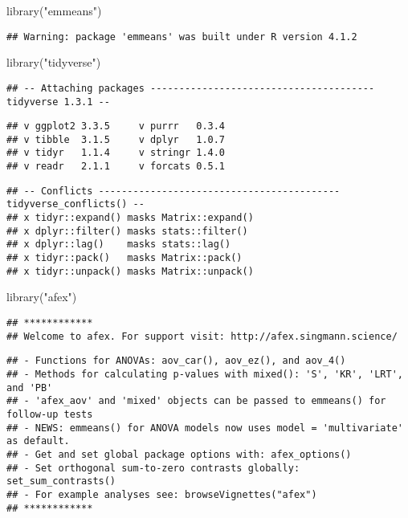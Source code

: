 \documentclass[
]{article}
\newenvironment{Shaded}{\begin{snugshade}}{\end{snugshade}}
\newcommand{\FunctionTok}[1]{\textcolor[rgb]{0.00,0.00,0.00}{#1}}
\newcommand{\NormalTok}[1]{#1}
\newcommand{\StringTok}[1]{\textcolor[rgb]{0.31,0.60,0.02}{#1}}
\begin{document}
\begin{Shaded}
\begin{Highlighting}[]
\FunctionTok{library}\NormalTok{(}\StringTok{"emmeans"}\NormalTok{)}
\end{Highlighting}
\end{Shaded}

\begin{verbatim}
## Warning: package 'emmeans' was built under R version 4.1.2
\end{verbatim}

\begin{Shaded}
\begin{Highlighting}[]
\FunctionTok{library}\NormalTok{(}\StringTok{"tidyverse"}\NormalTok{)}
\end{Highlighting}
\end{Shaded}

\begin{verbatim}
## -- Attaching packages --------------------------------------- tidyverse 1.3.1 --
\end{verbatim}

\begin{verbatim}
## v ggplot2 3.3.5     v purrr   0.3.4
## v tibble  3.1.5     v dplyr   1.0.7
## v tidyr   1.1.4     v stringr 1.4.0
## v readr   2.1.1     v forcats 0.5.1
\end{verbatim}

\begin{verbatim}
## -- Conflicts ------------------------------------------ tidyverse_conflicts() --
## x tidyr::expand() masks Matrix::expand()
## x dplyr::filter() masks stats::filter()
## x dplyr::lag()    masks stats::lag()
## x tidyr::pack()   masks Matrix::pack()
## x tidyr::unpack() masks Matrix::unpack()
\end{verbatim}

\begin{Shaded}
\begin{Highlighting}[]
\FunctionTok{library}\NormalTok{(}\StringTok{"afex"}\NormalTok{)}
\end{Highlighting}
\end{Shaded}

\begin{verbatim}
## ************
## Welcome to afex. For support visit: http://afex.singmann.science/
\end{verbatim}

\begin{verbatim}
## - Functions for ANOVAs: aov_car(), aov_ez(), and aov_4()
## - Methods for calculating p-values with mixed(): 'S', 'KR', 'LRT', and 'PB'
## - 'afex_aov' and 'mixed' objects can be passed to emmeans() for follow-up tests
## - NEWS: emmeans() for ANOVA models now uses model = 'multivariate' as default.
## - Get and set global package options with: afex_options()
## - Set orthogonal sum-to-zero contrasts globally: set_sum_contrasts()
## - For example analyses see: browseVignettes("afex")
## ************
\end{verbatim}
\end{document}
